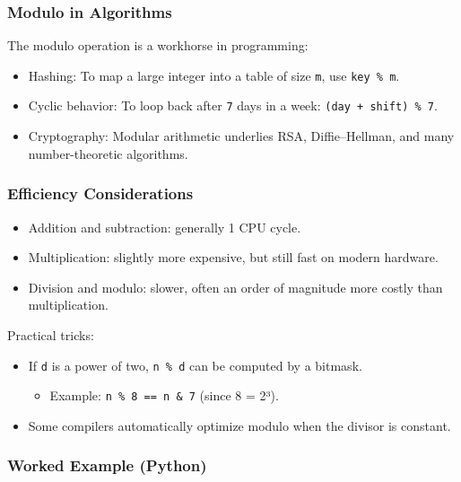 \documentclass[
  letterpaper,
  DIV=11,
  numbers=noendperiod]{scrreprt}
\providecommand{\tightlist}{%
  \setlength{\itemsep}{0pt}\setlength{\parskip}{0pt}}
\begin{document}
\subsubsection{Modulo in Algorithms}\label{modulo-in-algorithms}

The modulo operation is a workhorse in programming:

\begin{itemize}
\item
  Hashing: To map a large integer into a table of size \texttt{m}, use
  \texttt{key\ \%\ m}.
\item
  Cyclic behavior: To loop back after \texttt{7} days in a week:
  \texttt{(day\ +\ shift)\ \%\ 7}.
\item
  Cryptography: Modular arithmetic underlies RSA, Diffie--Hellman, and
  many number-theoretic algorithms.
\end{itemize}

\subsubsection{Efficiency
Considerations}\label{efficiency-considerations}

\begin{itemize}
\tightlist
\item
  Addition and subtraction: generally 1 CPU cycle.
\item
  Multiplication: slightly more expensive, but still fast on modern
  hardware.
\item
  Division and modulo: slower, often an order of magnitude more costly
  than multiplication.
\end{itemize}

Practical tricks:

\begin{itemize}
\item
  If \texttt{d} is a power of two, \texttt{n\ \%\ d} can be computed by
  a bitmask.

  \begin{itemize}
  \tightlist
  \item
    Example: \texttt{n\ \%\ 8\ ==\ n\ \&\ 7} (since 8 = 2³).
  \end{itemize}
\item
  Some compilers automatically optimize modulo when the divisor is
  constant.
\end{itemize}

\subsubsection{Worked Example (Python)}\label{worked-example-python-2}
\end{document}
